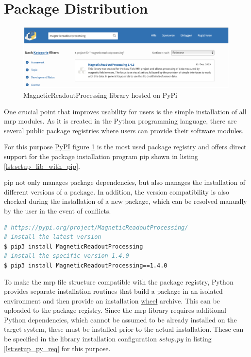 \hypertarget{package-distribution}{%
\section{Package Distribution}\label{package-distribution}}

\begin{figure}
\centering
\includegraphics{./generated_images/border_MagneticReadoutProcessing_library_hosted_on_PyPi.png}
\caption{MagneticReadoutProcessing library hosted on PyPi
\label{MagneticReadoutProcessing_library_hosted_on_PyPi.png}}
\end{figure}

One crucial point that improves usability for users is the simple
installation of all \gls{mrp} modules. As it is created in the Python
programming language, there are several public package registries where
users can provide their software modules.

For this purpose \href{https://pypi.org}{PyPI} figure
\ref{MagneticReadoutProcessing_library_hosted_on_PyPi.png} is the most
used package registry and offers direct support for the package
installation program \gls{pip} shown in listing
\ref{lst:setup_lib_with_pip}.

\gls{pip} not only manages package dependencies, but also manages the
installation of different versions of a package. In addition, the
version compatibility is also checked during the installation of a new
package, which can be resolved manually by the user in the event of
conflicts.

\begin{lstlisting}[language=bash, caption={Bash commands to install the MagneticReadoutProcessing library using pip}, label=lst:setup_lib_with_pip]
# https://pypi.org/project/MagneticReadoutProcessing/
# install the latest version
$ pip3 install MagneticReadoutProcessing
# install the specific version 1.4.0
$ pip3 install MagneticReadoutProcessing==1.4.0
\end{lstlisting}

To make the \gls{mrp} file structure compatible with the package
registry, Python provides separate installation routines that build a
package in an isolated environment and then provide an installation
\href{https://peps.python.org/pep-0427/}{wheel} archive. This can be
uploaded to the package registry. Since the \gls{mrp}-library requires
additional Python dependencies, which cannot be assumed to be already
installed on the target system, these must be installed prior to the
actual installation. These can be specified in the library installation
configuration \emph{setup.py} in listing \ref{lst:setup_py_req} for this
purpose.

